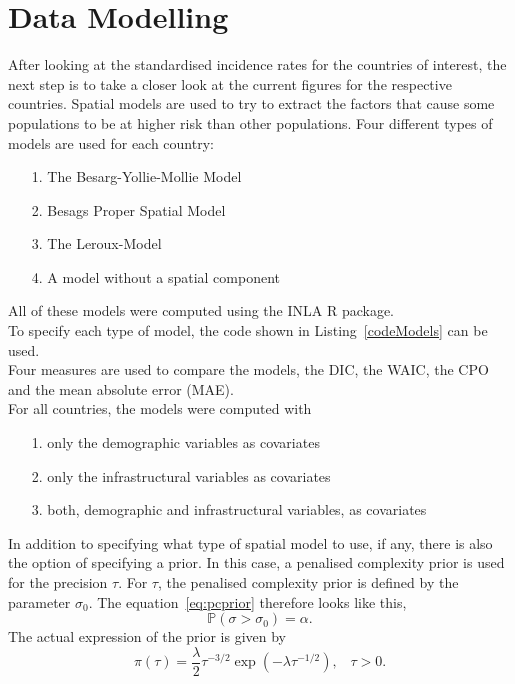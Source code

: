 \section{Data Modelling}
After looking at the standardised incidence rates for the countries of interest, the next step is to take a closer look at the current figures for the respective countries. Spatial models are used to try to extract the factors that cause some populations to be at higher risk than other populations. Four different types of models are used for each country:
\begin{itemize}
    \item[1.] The Besarg-Yollie-Mollie Model
    \item[2.] Besags Proper Spatial Model
    \item[3.] The Leroux-Model
    \item[4.] A model without a spatial component
\end{itemize}
All of these models were computed using the INLA \cite{rinla} R package. \\
To specify each type of model, the code shown in Listing~\ref{codeModels} can be used. \\
Four measures are used to compare the models, the DIC, the WAIC, the CPO and the mean absolute error (MAE).\\
For all countries, the models were computed with
\begin{itemize}
    \item[1.] only the demographic variables as covariates
    \item[2.] only the infrastructural variables as covariates
    \item[3.] both, demographic and infrastructural variables, as covariates
\end{itemize}
In addition to specifying what type of spatial model to use, if any, there is also the option of specifying a prior. In this case, a penalised complexity prior is used for the precision $\tau$. For $\tau$, the penalised complexity prior is defined by the parameter $\sigma_0$. The equation~\ref{eq:pcprior} therefore looks like this,
\begin{equation}\label{pcprec}
    \mathbb{P}\left(\sigma > \sigma_0\right)=\alpha.
\end{equation}
The actual expression of the prior is given by
\begin{equation}
    \pi\left(\tau\right)=\frac{\lambda}{2}\tau^{-3/2}\exp\left(-\lambda\tau^{-1/2}\right),\hspace{10pt}\tau>0.
\end{equation}
